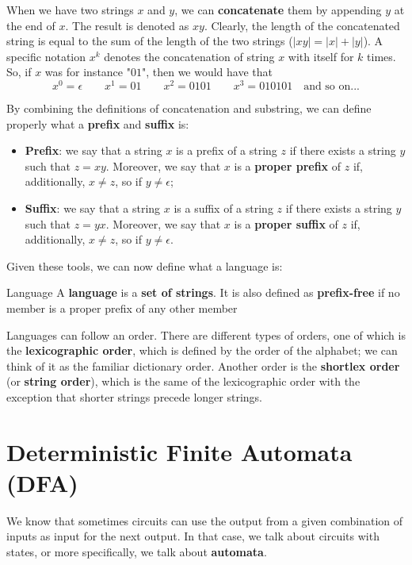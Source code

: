 \noindent When we have two strings $x$ and $y$, we can \textbf{concatenate} them by appending $y$ at the end of $x$. The result is denoted as $xy$. Clearly, the length of the concatenated string is equal to the sum of the length of the two strings ($|xy| = |x| + |y|$). A specific notation $x^k$ denotes the concatenation of string $x$ with itself for $k$ times. So, if $x$ was for instance "$01$", then we would have that
\[ x^0 = \epsilon \quad \quad x^1 = 01 \quad \quad x^2 = 0101 \quad \quad x^3 = 010101 \quad \text{and so on...} \]

\noindent By combining the definitions of concatenation and substring, we can define properly what a \textbf{prefix} and \textbf{suffix} is:
\begin{itemize}
    \item \textbf{Prefix}: we say that a string $x$ is a prefix of a string $z$ if there exists a string $y$ such that $z = xy$. Moreover, we say that $x$ is a \textbf{proper prefix} of $z$ if, additionally, $x \neq z$, so if $y \neq \epsilon$;
    \item \textbf{Suffix}: we say that a string $x$ is a suffix of a string $z$ if there exists a string $y$ such that $z = yx$. Moreover, we say that $x$ is a \textbf{proper suffix} of $z$ if, additionally, $x \neq z$, so if $y \neq \epsilon$.
\end{itemize}

\noindent Given these tools, we can now define what a language is:

\begin{definition}{Language}
    A \textbf{language} is a \textbf{set of strings}. It is also defined as \textbf{prefix-free} if no member is a proper prefix of any other member
\end{definition}

\noindent Languages can follow an order. There are different types of orders, one of which is the \textbf{lexicographic order}, which is defined by the order of the alphabet; we can think of it as the familiar dictionary order. Another order is the \textbf{shortlex order} (or \textbf{string order}), which is the same of the lexicographic order with the exception that shorter strings precede longer strings.

\section{Deterministic Finite Automata (DFA)}

We know that sometimes circuits can use the output from a given combination of inputs as input for the next output. In that case, we talk about circuits with states, or more specifically, we talk about \textbf{automata}.

